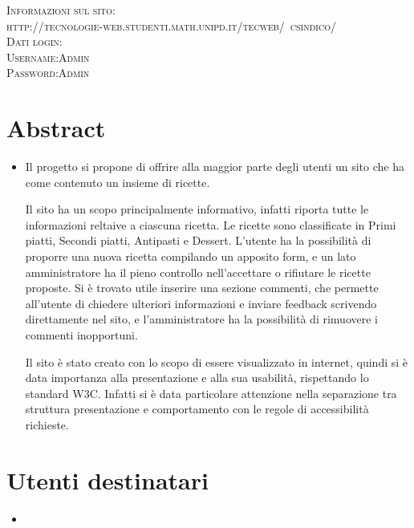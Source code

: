 \documentclass[12pt]{article}
\begin{document}
\begin{titlepage}
		
		\textsc{\Large Informazioni sul sito:}\\[0.3cm]	
		\textsc{http://tecnologie-web.studenti.math.unipd.it/tecweb/~csindico/}\\[1cm]
		
		
			\textsc{\Large Dati login:}\\[0.3cm]
			\textsc{ Username:Admin}\\[0.1mm]
			\textsc{ Password:Admin}\\[0.1mm]
		\vfill
	\end{titlepage}
	
	\newpage
	\renewcommand{\contentsname}{Indice}
	\tableofcontents
	
	
	\newpage
	
	\section{Abstract}
	\begin{itemize}
		\item Il progetto si propone di offrire  alla maggior parte degli utenti  un sito che ha come contenuto un insieme di ricette. 
			
		Il sito ha un scopo principalmente informativo, infatti riporta tutte le informazioni reltaive a ciascuna ricetta. Le ricette sono classificate in Primi piatti, Secondi piatti, Antipasti e Dessert. L'utente ha la possibilità di proporre una nuova ricetta compilando un apposito form, e un lato amministratore ha il pieno controllo nell'accettare o rifiutare le ricette proposte. Si è trovato utile inserire una sezione commenti, che permette all'utente di chiedere ulteriori informazioni e inviare feedback scrivendo direttamente nel sito, e l'amministratore ha la possibilità di rimuovere i commenti inopportuni.
		
		Il sito è stato creato con lo scopo di essere visualizzato in internet, quindi si è data importanza alla presentazione e alla sua usabilità, rispettando lo standard W3C. Infatti si è data particolare attenzione nella separazione tra struttura presentazione e comportamento con le regole di accessibilità richieste.
	\end{itemize}
		\section{Utenti destinatari}
		\begin{itemize}
			\item
		\end{itemize}
	
	
\end{document}
